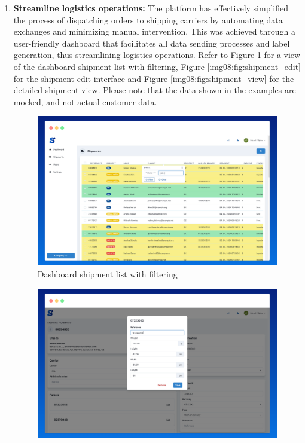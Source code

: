 \begin{enumerate}[label=\bfseries G\arabic*:,leftmargin=*]
    \item \textbf{Streamline logistics operations:} The platform has effectively simplified the process of dispatching orders to shipping carriers by automating data exchanges and minimizing manual intervention. 
    This was achieved through a user-friendly dashboard that facilitates all data sending processes and label generation, thus streamlining logistics operations.
    Refer to Figure \ref{img08:fig:shipment_list} for a view of the dashboard shipment list with filtering, Figure \ref{img08:fig:shipment_edit} for the shipment edit interface and Figure \ref{img08:fig:shipment_view} for the detailed shipment view.
    Please note that the data shown in the examples are mocked, and not actual customer data.
    \begin{figure}[H]\centering
    \includegraphics[width=140mm]{img/chap08/gui_shipment_list.png}
    \caption{Dashboard shipment list with filtering}
    \label{img08:fig:shipment_list}
    \end{figure}
    \begin{figure}[H]\centering
    \includegraphics[width=140mm]{img/chap08/gui_shipment_detail.png}

\end{figure}
\end{enumerate}
